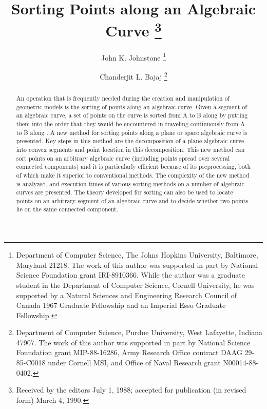 \newcommand{\wwh}{\mbox{$\widehat{W_{1}W_{2}}$}}
\newcommand{\wo}{\mbox{$W_{1}$}}
\newcommand{\wt}{\mbox{$W_{2}$}}
\newcommand{\param}{{parameterization} }
\newcommand{\wallpoint}{curve point}
\newcommand{\wallpoints}{curve points}
\newcommand{\wall}{wall}
\newcommand{\walls}{walls}
\newcommand{\cellsegment}{cell segment}
\newcommand{\x}{X}
\newcommand{\y}{Y}
\newcommand{\SSo}{{\cal S}}
\newcommand{\SSt}{\mbox{S\hspace{-0.68em}S\hspace{.25em}}}  
%
\title{Sorting Points along an Algebraic Curve%
	\thanks{Received by the editors July 1, 1988;
	accepted for publication (in revised form) March 4, 1990.}}
\author{John K. Johnstone%
	\thanks{Department of Computer Science, The Johns Hopkins University, 
		Baltimore, Maryland 21218.
	The work of this author was supported in part by National Science Foundation grant 
	IRI-8910366.
	While the author was a graduate
	student in the Department of Computer Science, Cornell University, he was supported
	by a Natural Sciences and Engineering
	Research Council of Canada 1967 Graduate 
	Fellowship and an Imperial Esso Graduate Fellowship.}
\and
	Chanderjit L. Bajaj%
	\thanks{Department of Computer Science, Purdue University, 
		West Lafayette, Indiana  47907.
	The work of this author was supported in part by National Science Foundation grant
	MIP-88-16286, 
	Army Research Office contract DAAG 29-85-C0018 under Cornell MSI, and
	Office of Naval Research grant N00014-88-0402.}}

\maketitle

\begin{abstract}
An operation that is frequently needed during the creation and manipulation of geometric 
models is the sorting of points along an algebraic curve.
Given a segment  of an algebraic curve, a set of points on the curve is sorted
from A to B along  by putting them into the order that they would be encountered 
in traveling continuously from A to B along .
A new method for sorting points along a plane or space algebraic curve is presented.
Key steps in this method are the decomposition of a plane algebraic curve into convex 
segments and point location in this decomposition.
This new method can sort points on an arbitrary algebraic curve 
(including points spread over several connected components)
and it is particularly efficient 
because of its preprocessing, both of which make it superior to conventional methods.
The complexity of the new method is analyzed, and execution times of various sorting
methods on a number of algebraic curves are presented.
The theory developed for sorting can also be used to locate points on an arbitrary 
segment of an algebraic curve and to decide whether two points lie on the same connected 
component.
\end{abstract}

